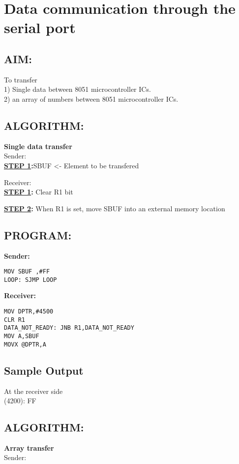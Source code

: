 \chapter{ Data communication through the serial port }
%
%
%
%
\section*{AIM:}
To transfer \\
 1) Single data between 8051 microcontroller ICs.\\
 2) an array of numbers  between 8051 microcontroller ICs.

\section*{ALGORITHM:}
\textbf{Single data transfer}\\
\large{Sender:}\\

\textbf{\underline{STEP 1}:}SBUF <- Element to be transfered

\large{Receiver:}\\
\textbf{\underline{STEP 1}:} Clear R1 bit 

\textbf{\underline{STEP 2}:} When R1 is set, move SBUF into an external memory location



\section*{PROGRAM:}
\textbf{Sender:}
\begin{lstlisting}
MOV SBUF ,#FF
LOOP: SJMP LOOP
\end{lstlisting}

\vspace{20pt}

\textbf{Receiver:}
\begin{lstlisting}
MOV DPTR,#4500
CLR R1 
DATA_NOT_READY: JNB R1,DATA_NOT_READY
MOV A,SBUF
MOVX @DPTR,A
\end{lstlisting}




\section*{Sample Output}
At the receiver side\\
(4200): FF

\vspace{30pt}

\section*{ALGORITHM:}
\textbf{Array transfer}\\
\large{Sender:}\\

